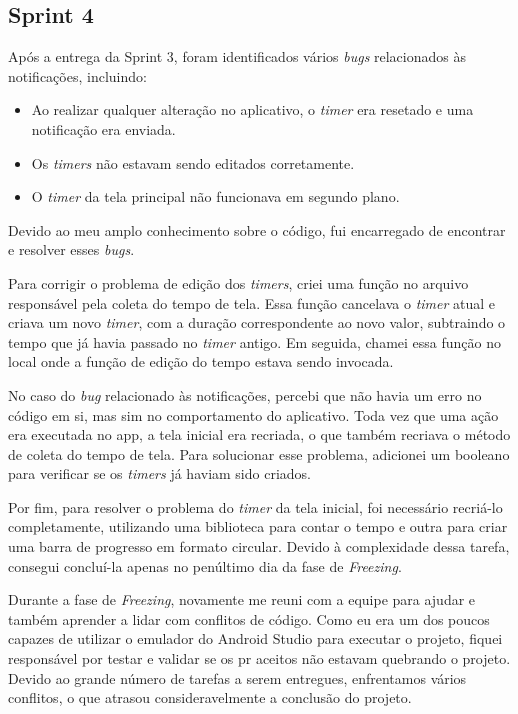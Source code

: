 \subsection{Sprint 4}

Após a entrega da Sprint 3, foram identificados vários \textit{bugs} relacionados às notificações, incluindo:
\begin{itemize}
    \item Ao realizar qualquer alteração no aplicativo, o \textit{timer} era resetado e uma notificação era enviada.
    \item Os \textit{timers} não estavam sendo editados corretamente.
    \item O \textit{timer} da tela principal não funcionava em segundo plano.
\end{itemize}

Devido ao meu amplo conhecimento sobre o código, fui encarregado de encontrar e resolver esses \textit{bugs}.

Para corrigir o problema de edição dos \textit{timers}, criei uma função no arquivo responsável pela coleta do tempo de tela. Essa função cancelava o \textit{timer} atual e criava um novo \textit{timer}, com a duração correspondente ao novo valor, subtraindo o tempo que já havia passado no \textit{timer} antigo. Em seguida, chamei essa função no local onde a função de edição do tempo estava sendo invocada.

No caso do \textit{bug} relacionado às notificações, percebi que não havia um erro no código em si, mas sim no comportamento do aplicativo. Toda vez que uma ação era executada no app, a tela inicial era recriada, o que também recriava o método de coleta do tempo de tela. Para solucionar esse problema, adicionei um booleano para verificar se os \textit{timers} já haviam sido criados.

Por fim, para resolver o problema do \textit{timer} da tela inicial, foi necessário recriá-lo completamente, utilizando uma biblioteca para contar o tempo e outra para criar uma barra de progresso em formato circular. Devido à complexidade dessa tarefa, consegui concluí-la apenas no penúltimo dia da fase de \textit{Freezing}.

Durante a fase de \textit{Freezing}, novamente me reuni com a equipe para ajudar e também aprender a lidar com conflitos de código. Como eu era um dos poucos capazes de utilizar o emulador do Android Studio para executar o projeto, fiquei responsável por testar e validar se os \ac{pr} aceitos não estavam quebrando o projeto. Devido ao grande número de tarefas a serem entregues, enfrentamos vários conflitos, o que atrasou consideravelmente a conclusão do projeto.

